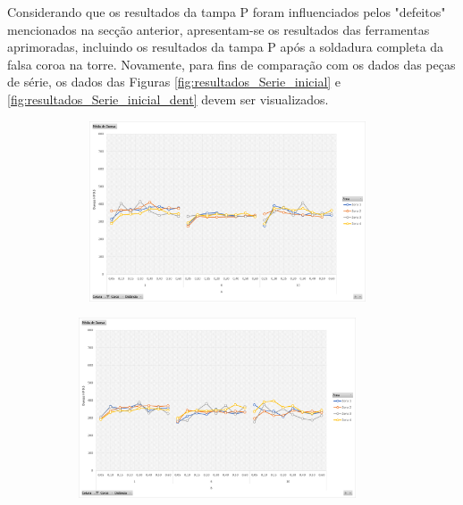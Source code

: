 Considerando que os resultados da tampa P foram influenciados pelos "defeitos" mencionados na secção anterior, apresentam-se os resultados das ferramentas aprimoradas, incluindo os resultados da tampa P após a soldadura completa da falsa coroa na torre. Novamente, para fins de comparação com os dados das peças de série, os dados das Figuras \ref{fig:resultados_Serie_inicial} e \ref{fig:resultados_Serie_inicial_dent} devem ser visualizados.
\begin{figure}[htb]
    \centering
    \begin{subfigure}{.4\textwidth}\
        \centering
        \includegraphics[width = 0.9\textwidth]{Figures/Cap4/Grafico_4_Zonas_Y.png}
        \caption{}
        \label{fig:resultados_Tampa_Y}
    \end{subfigure}%
    \begin{subfigure}{.4\textwidth}
        \centering
        \includegraphics[width = 0.9\textwidth]{Figures/Cap4/Grafico_4_Zonas_O.png}
        \caption{}
        \label{fig:resultados_Tampa_O}

\end{subfigure}
\end{figure}
